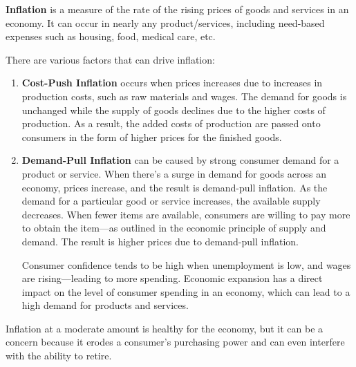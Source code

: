 \documentclass{article}
\begin{document}
    \begin{definition}[Inflation]
      \textbf{Inflation} is a measure of the rate of the rising prices of goods and services in an economy. It can occur in nearly any product/services, including need-based expenses such as housing, food, medical care, etc. 

      There are various factors that can drive inflation: 
      \begin{enumerate}
        \item \textbf{Cost-Push Inflation} occurs when prices increases due to increases in production costs, such as raw materials and wages. The demand for goods is unchanged while the supply of goods declines due to the higher costs of production. As a result, the added costs of production are passed onto consumers in the form of higher prices for the finished goods. 
        \item \textbf{Demand-Pull Inflation} can be caused by strong consumer demand for a product or service. When there's a surge in demand for goods across an economy, prices increase, and the result is demand-pull inflation. As the demand for a particular good or service increases, the available supply decreases. When fewer items are available, consumers are willing to pay more to obtain the item—as outlined in the economic principle of supply and demand. The result is higher prices due to demand-pull inflation.
        
        Consumer confidence tends to be high when unemployment is low, and wages are rising—leading to more spending. Economic expansion has a direct impact on the level of consumer spending in an economy, which can lead to a high demand for products and services.
      \end{enumerate}

      Inflation at a moderate amount is healthy for the economy, but it can be a concern because it erodes a consumer's purchasing power and can even interfere with the ability to retire. 
    \end{definition}
\end{document}
